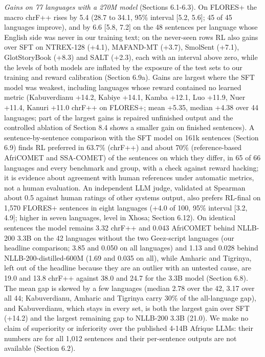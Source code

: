 \begin{enumerate}
  \emph{Gains on 77 languages with a 270M model} (Sections 6.1-6.3). On FLORES+ the macro chrF++ rises by 5.4 (28.7 to 34.1, 95\% interval {[}5.2, 5.6{]}; 45 of 45 languages improve), and by 6.6 {[}5.8, 7.2{]} on the 48 sentences per language whose English side was never in our training text; on the never-seen rows RL also gains over SFT on NTREX-128 (+4.1), MAFAND-MT (+3.7), SmolSent (+7.1), GlotStoryBook (+8.3) and SALT (+2.3), each with an interval above zero, while the levels of both models are inflated by the exposure of the test sets to our training and reward calibration (Section 6.9a). Gains are largest where the SFT model was weakest, including languages whose reward contained no learned metric (Kabuverdianu +14.2, Kabiye +14.1, Kamba +12.1, Luo +11.9, Nuer +11.4, Kanuri +11.0 chrF++ on FLORES+; mean +5.35, median +4.38 over 44 languages; part of the largest gains is repaired unfinished output and the controlled ablation of Section 8.4 shows a smaller gain on finished sentences). A sentence-by-sentence comparison with the SFT model on 161k sentences (Section 6.9) finds RL preferred in 63.7\% (chrF++) and about 70\% (reference-based AfriCOMET and SSA-COMET) of the sentences on which they differ, in 65 of 66 languages and every benchmark and group, with a check against reward hacking; it is evidence about agreement with human references under automatic metrics, not a human evaluation. An independent LLM judge, validated at Spearman about 0.5 against human ratings of other systems\textquotesingle{} output, also prefers RL-final on 1,570 FLORES+ sentences in eight languages (+4.0 of 100, 95\% interval {[}3.2, 4.9{]}; higher in seven languages, level in Xhosa; Section 6.12). On identical sentences the model remains 3.32 chrF++ and 0.043 AfriCOMET behind NLLB-200 3.3B on the 42 languages without the two Ge\textquotesingle ez-script languages (our headline comparison; 3.85 and 0.050 on all languages) and 1.13 and 0.028 behind NLLB-200-distilled-600M (1.69 and 0.035 on all), while Amharic and Tigrinya, left out of the headline because they are an outlier with an untested cause, are 19.0 and 13.8 chrF++ against 38.0 and 24.7 for the 3.3B model (Section 6.8). The mean gap is skewed by a few languages (median 2.78 over the 42, 3.17 over all 44; Kabuverdianu, Amharic and Tigrinya carry 30\% of the all-language gap), and Kabuverdianu, which stays in every set, is both the largest gain over SFT (+14.2) and the largest remaining gap to NLLB-200 3.3B (21.0). We make no claim of superiority or inferiority over the published 4-14B Afrique LLMs: their numbers are for all 1,012 sentences and their per-sentence outputs are not available (Section 6.2).

\end{enumerate}
